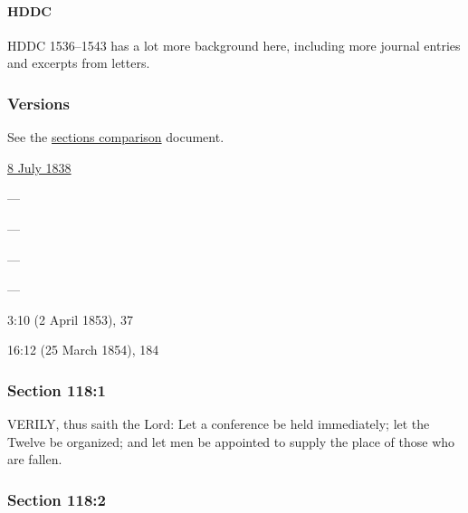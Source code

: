 		\paragraph{HDDC}
		
			HDDC 1536--1543 has a lot more background here, including more journal entries and excerpts from letters.
					
	\subsubsection{Versions}
		\label{DC118-V}
		
		See the \href{https://drive.google.com/file/d/1goAvNz8jS4R8slYfMG_db55Ty2z_vmgK/view?usp=sharing}{sections comparison} document.
	
		\begin{compactdesc}
			\item[JSP] \hyperref[EMS-1838-JS-8-JUL-1838-A]{8 July 1838}
			\item[BC] ---
			\item[DC 1835] ---
			\item[DC 1844] ---
			\item[TS] ---
			\item[DN] 3:10 (2 April 1853), 37
			\item[MS] 16:12 (25 March 1854), 184
		\end{compactdesc}

	\subsubsection{Section 118:1} %
		\label{DC118-1}

		VERILY, thus saith the Lord: Let a conference be held immediately; let the Twelve be organized; and let men be appointed to supply the place of those who are fallen.


	\subsubsection{Section 118:2} %
		\label{DC118-2}

